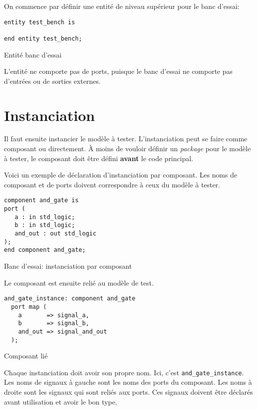 \documentclass[letter, oneside]{book}
\begin{document}
On commence par définir une entité de niveau supérieur pour le banc
d'essai:

\begin{listing}[htbp]
\begin{verbatim}
entity test_bench is

end entity test_bench;
\end{verbatim}
\caption{Entité banc d'essai}
\end{listing}

L'entité ne comporte pas de ports, puisque le banc d'essai ne comporte
pas d'entrées ou de sorties externes.

\section{Instanciation}
\label{sec:org6d215db}

Il faut ensuite instancier le modèle à tester. L'instanciation peut se
faire comme composant ou directement. À moins de vouloir définir un
\emph{package} pour le modèle à tester, le composant doit être défini \textbf{avant}
le code principal. 

Voici un exemple de déclaration d'instanciation par composant. Les
noms de composant et de ports doivent correspondre à ceux du modèle à
tester.

\begin{listing}[htbp]
\begin{verbatim}
component and_gate is 
port ( 
   a : in std_logic; 
   b : in std_logic; 
   and_out : out std_logic 
); 
end component and_gate; 
\end{verbatim}
\caption{Banc d'essai: instanciation par composant}
\end{listing}

Le composant est ensuite relié au modèle de test. 

\begin{listing}[htbp]
\begin{verbatim}
and_gate_instance: component and_gate
  port map (
    a       => signal_a,
    b       => signal_b,
    and_out => signal_and_out
  );
\end{verbatim}
\caption{Composant lié}
\end{listing}

Chaque instanciation doit avoir son propre nom. Ici, c'est
\texttt{and\_gate\_instance}. Les noms de signaux à gauche sont les noms des
ports du composant. Les noms à droite sont les signaux qui sont reliés
aux ports. Ces signaux doivent être déclarés avant utilisation et
avoir le bon type.
\end{document}
